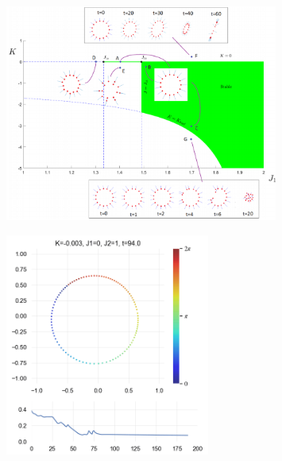\documentclass[10pt,aspectratio=43,mathserif,table]{beamer}
\begin{document}
\begin{frame}
    \begin{figure}
        \centering
        \includegraphics[width=0.8\textwidth]{f2.png}
    \end{figure}
\end{frame}

\begin{frame}
    \begin{figure}
        \centering
        \includegraphics[width=0.6\textwidth]{withOP.png}
    \end{figure}
\end{frame}

\begin{frame}
    
\end{frame}
\end{document}
